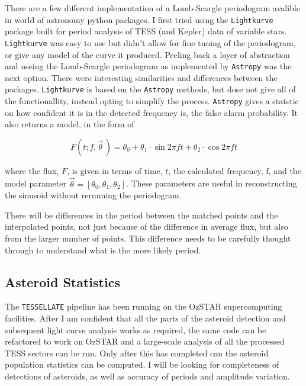 \documentclass[12pt]{article}
\begin{document}
There are a few different implementation of a Lomb-Scargle periodogram avalible in world of astronomy python packages.
I first tried using the \texttt{Lightkurve} \citep{Lightkurve2018} package built for period analysis of TESS (and Kepler) data of variable stars.
\texttt{Lightkurve} was easy to use but didn't allow for fine tuning of the periodogram, or give any model of the curve it produced.
Peeling back a layer of abstraction and useing the Lomb-Scargle periodogram as implemented by \texttt{Astropy}\citep{Astropy2022} was the next option.
There were interesting similarities and differences between the packages.
\texttt{Lightkurve} is based on the \texttt{Astropy} methods, but dose not give all of the functionallity, instead opting to simplify the process.
\texttt{Astropy} gives a statstic on how confident it is in the detected frequency is, the false alarm probability.
It also returns a model, in the form of

\begin{equation}
  \label{Eq:LCModel}
  F(t;f,\vec{\theta}\,) = \theta_0 + \theta_1\cdot\sin{2\pi ft} +\theta_2\cdot\cos{2\pi ft}
\end{equation}

where the flux, $F$, is given in terms of time, $t$, the calculated frequency, f, and the model parameter $\vec{\theta} = [\theta_0, \theta_1,\theta_2]$.
These parameters are useful in reconstructing the sinusoid without rerunning the periodogram.

There will be differences in the period between the matched points and the interpolated points, not just because of the difference in average flux, but also from the larger number of points. This difference needs to be carefully thought through to understand what is the more likely period.

\subsection{Asteroid Statistics}\label{SubSec:StatMeth}

The \texttt{TESSELLATE} pipeline has been running on the OzSTAR supercomputing facilities.
After I am confident that all the parts of the asteroid detection and subsequent light curve analysis works as required, the same code can be refactored to work on OzSTAR and a large-scale analysis of all the processed TESS sectors can be run.
Only after this has completed can the asteroid population statistics can be computed.
I will be looking for completeness of detections of asteroids, as well as accuracy of periods and amplitude variation.
\end{document}
